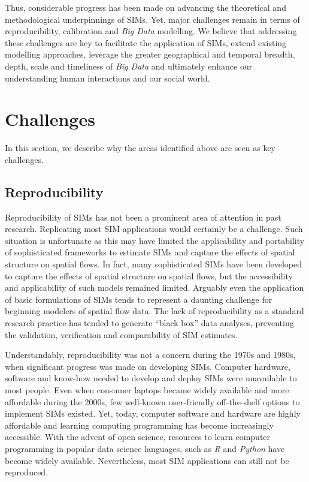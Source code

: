 \documentclass[11pt,letterpaper]{article}
\begin{document}
Thus, considerable progress has been made on advancing the theoretical and methodological underpinnings of SIMs.
Yet, major challenges remain in terms of reproducibility, calibration and \emph{Big Data} modelling.
We believe that addressing these challenges are key to facilitate the application of SIMs, extend existing modelling approaches, leverage the greater geographical and temporal breadth, depth, scale and timeliness of \emph{Big Data} and ultimately enhance our understanding human interactions and our social world.

\hypertarget{challenges}{%
\section{Challenges}\label{challenges}}

In this section, we describe why the areas identified above are seen as key challenges.

\hypertarget{reproducibility}{%
\subsection{Reproducibility}\label{reproducibility}}

Reproducibility of SIMs has not been a prominent area of attention in past research.
Replicating most SIM applications would certainly be a challenge.
Such situation is unfortunate as this may have limited the applicability and portability of sophisticated frameworks to estimate SIMs and capture the effects of spatial structure on spatial flows.
In fact, many sophisticated SIMs have been developed to capture the effects of spatial structure on spatial flows, but the accessibility and applicability of such models remained limited.
Arguably even the application of basic formulations of SIMs tends to represent a daunting challenge for beginning modelers of spatial flow data.
The lack of reproducibility as a standard research practice has tended to generate ``black box'' data analyses, preventing the validation, verification and comparability of SIM estimates.

Understandably, reproducibility was not a concern during the 1970s and 1980s, when significant progress was made on developing SIMs.
Computer hardware, software and know-how needed to develop and deploy SIMs were unavailable to most people.
Even when consumer laptops became widely available and more affordable during the 2000s, few well-known user-friendly off-the-shelf options to implement SIMs existed.
Yet, today, computer software and hardware are highly affordable and learning computing programming has become increasingly accessible.
With the advent of open science, resources to learn computer programming in popular data science languages, such as \emph{R} and \emph{Python} have become widely available.
Nevertheless, most SIM applications can still not be reproduced.
\end{document}
